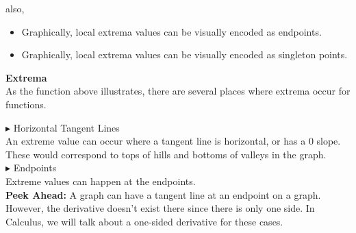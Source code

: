\documentclass{ximera}
\begin{document}
also, \\

\begin{itemize}
\item Graphically, local extrema values can be visually encoded as endpoints.
\item Graphically, local extrema values can be visually encoded as singleton points.
\end{itemize}



\begin{template} \textbf{\textcolor{blue!55!black}{Extrema}} \\

As the function above illustrates, there are several places where extrema occur for functions.


\textbf{\textcolor{red!70!darkgray}{$\blacktriangleright$}} Horizontal Tangent Lines \\

An extreme value can occur where a tangent line is horizontal, or has a $0$ slope.  These would correspond to tops of hills and bottoms of valleys in the graph. \\




\textbf{\textcolor{red!70!darkgray}{$\blacktriangleright$}} Endpoints \\

Extreme values can happen at the endpoints. \\

\textbf{\textcolor{red!70!darkgray}{Peek Ahead:}} A graph can have a tangent line at an endpoint on a graph.  However, the derivative doesn't exist there since there is only one side.  In Calculus, we will talk about a one-sided derivative for these cases. \\

\end{template}
\end{document}
